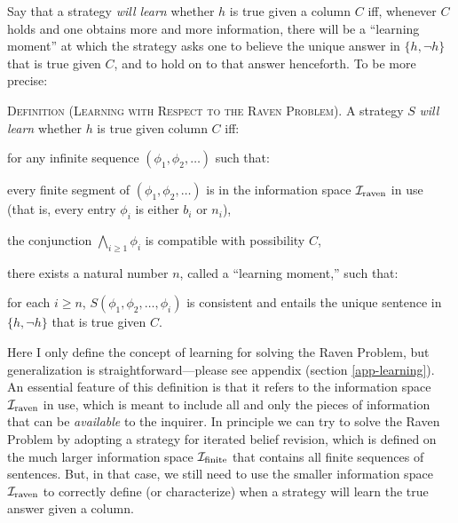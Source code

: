 Say that a strategy {\em will learn} whether $h$ is true given a column $C$ iff, whenever $C$ holds and one obtains more and more information, there will be a ``learning moment'' at which the strategy asks one to believe the unique answer in $\{h, \neg h\}$ that is true given $C$, and to hold on to that answer henceforth. To be more precise: \op

	\xm \textsc{Definition (Learning with Respect to the Raven Problem).} A strategy $S$ {\em will learn} whether $h$ is true given column $C$ iff: \op

		\xm for any infinite sequence $(\phi_1, \phi_2, \ldots)$ such that: \op

			\im every finite segment of $(\phi_1, \phi_2, \ldots)$ is in the information space ${\cal I}_\text{raven}$ in use (that  is, every entry $\phi_i$ is either $b_i$ or $n_i$),

			\im the conjunction $\bigwedge_{i \ge 1} \phi_i$ is compatible with possibility $C$,

		\ed there exists a natural number $n$, called a ``learning moment,'' such that: \op

			\im  for each $i\ge n$, $S(\phi_1, \phi_2, \ldots, \phi_i)$ is consistent and entails the unique sentence in $\{h, \neg h\}$ that is true given $C$.
		\ed\ed

\ed Here I only define the concept of learning for solving the Raven Problem, but generalization is straightforward---please see appendix (section \ref{app-learning}). An essential feature of this definition is that it refers to the information space ${\cal I}_\text{raven}$ in use, which is meant to include all and only the pieces of information that can be {\em available} to the inquirer. In principle we can try to solve the Raven Problem by adopting a strategy for iterated belief revision, which is defined on the much larger information space ${\cal I}_\text{finite}$ that contains all finite sequences of sentences. But, in that case, we still need to use the smaller information space ${\cal I}_\text{raven}$ to correctly define (or characterize) when a strategy will learn the true answer given a column.

